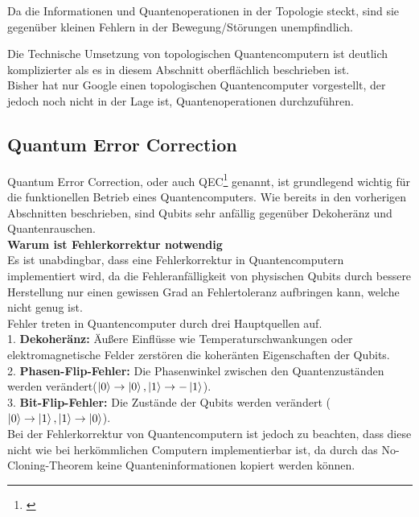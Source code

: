 Da die Informationen und Quantenoperationen in der Topologie steckt, sind sie gegenüber kleinen Fehlern in der Bewegung/Störungen unempfindlich.\\

\begin{tcolorbox}[title=Kommentar,
    title filled=false,
    colback=cyan!5!white,
    colframe=cyan!75!black]
    Die Technische Umsetzung von topologischen Quantencomputern ist deutlich komplizierter als es in diesem Abschnitt oberflächlich beschrieben ist.\\
    Bisher hat nur Google einen topologischen Quantencomputer vorgestellt, der jedoch noch nicht in der Lage ist, Quantenoperationen durchzuführen.
\end{tcolorbox}

\subsection{Quantum Error Correction}
\label{sub:quantum_error_correction}
Quantum Error Correction, oder auch QEC\footnote{\cite{qutech_academy_quantum_2018}} genannt, ist grundlegend wichtig für die funktionellen Betrieb eines Quantencomputers. Wie bereits in den vorherigen Abschnitten beschrieben,
sind Qubits sehr anfällig gegenüber Dekoheränz und Quantenrauschen.\\

\textbf{Warum ist Fehlerkorrektur notwendig}\\
Es ist unabdingbar, dass eine Fehlerkorrektur in Quantencomputern implementiert wird, da die Fehleranfälligkeit von physischen Qubits durch bessere Herstellung nur einen gewissen Grad an Fehlertoleranz aufbringen kann, welche nicht genug ist.\\

Fehler treten in Quantencomputer durch drei Hauptquellen auf.\\
1. \textbf{Dekoheränz:} Äußere Einflüsse wie Temperaturschwankungen oder elektromagnetische Felder zerstören die koheränten Eigenschaften der Qubits.\\
2. \textbf{Phasen-Flip-Fehler:} Die Phasenwinkel zwischen den Quantenzuständen werden verändert($\ket{0}\rightarrow\ket{0},\ket{1}\rightarrow-\ket{1}$).\\ 
3. \textbf{Bit-Flip-Fehler:} Die Zustände der Qubits werden verändert ($\ket{0}\rightarrow\ket{1},\ket{1}\rightarrow\ket{0}$).\\

Bei der Fehlerkorrektur von Quantencomputern ist jedoch zu beachten, dass diese nicht wie bei herkömmlichen Computern implementierbar ist, da durch das No-Cloning-Theorem keine Quanteninformationen kopiert werden können.\\

